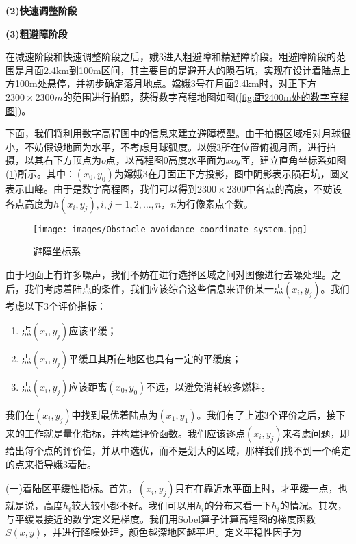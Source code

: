             \par
            \textbf{(2)快速调整阶段}
            \par
            \par
            \textbf{(3)粗避障阶段}
            \par
            在减速阶段和快速调整阶段之后，娥3进入粗避障和精避障阶段。粗避障阶段的范围是月面2.4km到100m区间，其主要目的是避开大的陨石坑，实现在设计着陆点上方100m处悬停，并初步确定落月地点。嫦娥3号在月面2.4km时，对正下方$2300\times 2300m$的范围进行拍照，获得数字高程地图如图(\ref{fig:距2400m处的数字高程图})。
            \par
            下面，我们将利用数字高程图中的信息来建立避障模型。由于拍摄区域相对月球很小，不妨假设地面为水平，不考虑月球弧度。以娥3所在位置俯视月面，进行拍摄，以其右下方顶点为$o$点，以高程图$0$高度水平面为$xoy$面，建立直角坐标系如图(\ref{fig:避障坐标系})所示。其中：$(x_0,y_0)$为嫦娥3在月面正下方投影，图中阴影表示陨石坑，圆叉表示山峰。由于是数字高程图，我们可以得到$2300\times 2300$中各点的高度，不妨设各点高度为$h(x_i,y_j),i,j=1,2,\dots,n$，$n$为行像素点个数。
            \begin{figure}[H]
            \centering
            \texttt{[image: images/Obstacle\_avoidance\_coordinate\_system.jpg]}
            \caption{避障坐标系}
            \label{fig:避障坐标系}
            \end{figure}
            \par
            由于地面上有许多噪声，我们不妨在进行选择区域之间对图像进行去噪处理。之后，我们考虑着陆点的条件，我们应该综合这些信息来评价某一点$(x_i,y_j)$。我们考虑以下3个评价指标：
            \begin{enumerate}
            \item 点$(x_i,y_j)$应该平缓；
            \item 点$(x_i,y_j)$平缓且其所在地区也具有一定的平缓度；
            \item 点$(x_i,y_j)$应该距离$(x_0,y_0)$不远，以避免消耗较多燃料。
            \end{enumerate}
            \par
            我们在$(x_i,y_j)$中找到最优着陆点为$(x_1,y_1)$。我们有了上述3个评价之后，接下来的工作就是量化指标，并构建评价函数。我们应该逐点$(x_i,y_j)$来考虑问题，即给出每个点的评价值，并从中选优，而不是划大的区域，那样我们找不到一个确定的点来指导娥3着陆。
            \par
            (一)着陆区平缓性指标。首先，$(x_i,y_j)$只有在靠近水平面上时，才平缓一点，也就是说，高度$h_i$较大较小都不好。我们可以用$h_i$的分布来看一下$h_i$的情况。其次，与平缓最接近的数学定义是梯度。我们用Sobel算子计算高程图的梯度函数$S(x,y)$，并进行降噪处理，颜色越深地区越平坦。定义平稳性因子为
